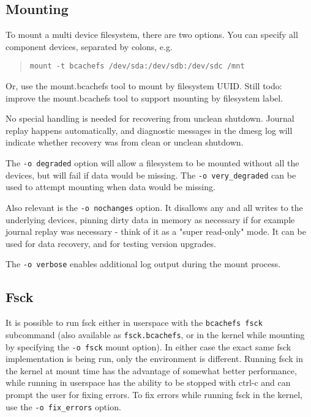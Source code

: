 \documentclass{article}
\begin{document}
\subsection{Mounting}

To mount a multi device filesystem, there are two options. You can specify all
component devices, separated by colons, e.g.
\begin{quote} \begin{verbatim}
mount -t bcachefs /dev/sda:/dev/sdb:/dev/sdc /mnt
\end{verbatim} \end{quote}
Or, use the mount.bcachefs tool to mount by filesystem UUID. Still todo: improve
the mount.bcachefs tool to support mounting by filesystem label.

No special handling is needed for recovering from unclean shutdown. Journal
replay happens automatically, and diagnostic messages in the dmesg log will
indicate whether recovery was from clean or unclean shutdown.

The \texttt{-o degraded} option will allow a filesystem to be mounted without
all the devices, but will fail if data would be missing. The
\texttt{-o very\_degraded} can be used to attempt mounting when data would be
missing.

Also relevant is the \texttt{-o nochanges} option. It disallows any and all
writes to the underlying devices, pinning dirty data in memory as necessary if
for example journal replay was necessary - think of it as a "super read-only"
mode. It can be used for data recovery, and for testing version upgrades.

The \texttt{-o verbose} enables additional log output during the mount process.

\subsection{Fsck}

It is possible to run fsck either in userspace with the \texttt{bcachefs fsck}
subcommand (also available as \texttt{fsck.bcachefs}, or in the kernel while
mounting by specifying the \texttt{-o fsck} mount option). In either case the
exact same fsck implementation is being run, only the environment is different.
Running fsck in the kernel at mount time has the advantage of somewhat better
performance, while running in userspace has the ability to be stopped with
ctrl-c and can prompt the user for fixing errors. To fix errors while running
fsck in the kernel, use the \texttt{-o fix\_errors} option.
\end{document}
